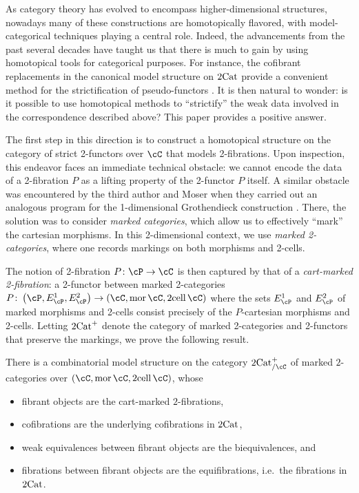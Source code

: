 \documentclass[11pt, dvipsnames]{amsart}
\begin{document}
As category theory has evolved to encompass higher-dimensional structures, nowadays many of these constructions are homotopically flavored, with model-categorical techniques playing a central role. Indeed, the advancements from the past several decades have taught us that there is much to gain by using homotopical tools for categorical purposes. For instance, the cofibrant replacements in the canonical model structure on $2\mathrm{Cat}$ provide a convenient method for the strictification of pseudo-functors \cite{Lack2004}. It is then natural to wonder: is it possible to use homotopical methods to ``strictify'' the weak data  involved in the correspondence described above? This paper provides a positive answer.

The first step in this direction is to construct a homotopical structure on the category of strict 2-functors over $\cC$ that models 2-fibrations. Upon inspection, this endeavor faces an immediate technical obstacle: we cannot encode the data of a 2-fibration $P$ as a lifting property of the 2-functor $P$ itself. A similar obstacle was encountered by the third author and Moser when they carried out an analogous program for the 1-dimensional Grothendieck construction \cite{mosersarazola2023model}. There, the solution was to consider \emph{marked categories}, which allow us to effectively ``mark'' the cartesian morphisms. In this 2-dimensional context, we use  \emph{marked 2-categories},  where one records markings on both morphisms and 2-cells.

The notion of 2-fibration $P\colon\cP\to\cC$ is then captured by that of a \emph{cart-marked 2-fibration}: a 2-functor between marked 2-categories $P\colon \markedscat{\cP}\to (\cC,\operatorname{mor}\cC,\operatorname{2cell}\cC)$ where the sets $E^1_\cP$ and $E^2_\cP$ of marked morphisms and 2-cells consist precisely of the $P$-cartesian morphisms and 2-cells. Letting $2\mathrm{Cat}^+$ denote the category of marked 2-categories and 2-functors that preserve the markings, we prove the following result.

\begin{theoremA}\label{theoremA}
There is a combinatorial model structure on the category $\twocat^{+}_{/ \cC}$ of marked $2$-categories over $(\cC,\operatorname{mor}\cC,\operatorname{2cell}\cC)$, whose
	\begin{itemize}
    \item 
		fibrant objects are the cart-marked $2$-fibrations,
		\item 
		cofibrations are the underlying cofibrations in $2\mathrm{Cat}$, 
		\item 
		weak equivalences between fibrant objects are the biequivalences, and
		\item fibrations between fibrant objects are the equifibrations, i.e.\ the fibrations in $2\mathrm{Cat}$.
	\end{itemize}
\end{theoremA}
\end{document}
